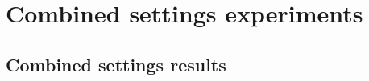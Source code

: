 

\section{Combined settings experiments}
\label{sec:exp-combos}
\subsection{Combined settings results}
\label{sec:combos-results}

